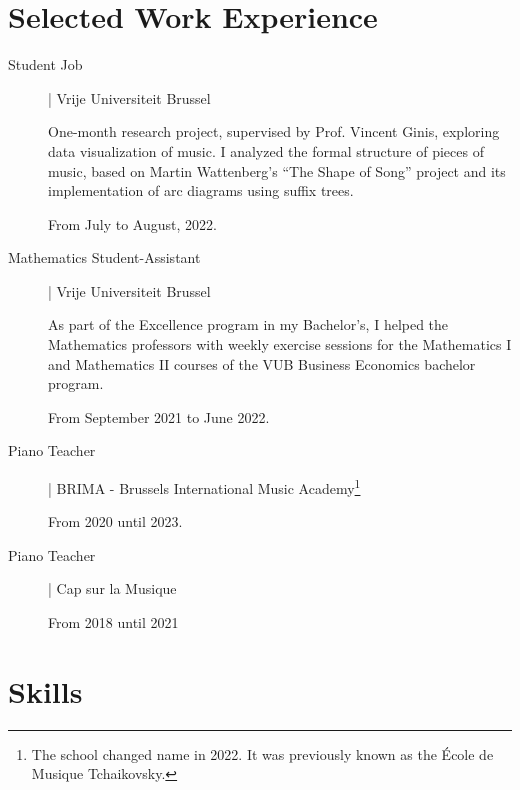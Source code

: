\documentclass[12pt]{article}
\newcommand{\mycolor}{mySlateBlue}
\newcommand{\thesectionicon}{}
\newcommand{\sectionicon}[1]{\renewcommand{\thesectionicon}{#1}}
\begin{document}
\section{Selected Work Experience}
\begin{description} 
\item[\textcolor{\mycolor}{Student Job}] | Vrije Universiteit Brussel

One-month research project, supervised by Prof. Vincent Ginis, exploring data visualization of music. I analyzed the formal structure of pieces of music, based on Martin Wattenberg’s “The Shape of Song” project and its implementation of arc diagrams using suffix trees.
  
From July to August, 2022.

\item[\textcolor{\mycolor}{Mathematics Student-Assistant}] | Vrije Universiteit Brussel

As part of the Excellence program in my Bachelor’s, I helped the Mathematics professors with weekly exercise sessions for the Mathematics I and Mathematics II courses of the VUB Business Economics bachelor program.

From September 2021 to June 2022.

\item[\textcolor{\mycolor}{Piano Teacher}] | BRIMA - Brussels International Music Academy\footnote{The school changed name in 2022. It was previously known as the École de Musique Tchaikovsky.}
  
From 2020 until 2023.

\item[\textcolor{\mycolor}{Piano Teacher}] | Cap sur la Musique

From 2018 until 2021

\end{description}


\sectionicon{\faTools}
\section{Skills}
\end{document}
